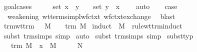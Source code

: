 \begin{isabellebody}
%
\isadelimproof
%
\endisadelimproof
%
\isatagproof
{}\isamarkupfalse%
\ goal{\isacharunderscore}cases\isanewline
{}\isamarkupfalse%
\ {}\isanewline
\ \ \isamarkupfalse%
\ {\isachardoublequoteopen}set\ {\isacharparenleft}{\isacharparenleft}x{\isacharcomma}{\isasymsigma}{\isacharparenright}\ {\isacharhash}\ {\isacharparenleft}y{\isacharcomma}{\isasympi}{\isacharparenright}\ {\isacharhash}\ {\isasymGamma}{\isacharparenright}\ {\isasymsubseteq}\ set\ {\isacharparenleft}{\isacharparenleft}y{\isacharcomma}{\isasympi}{\isacharparenright}\ {\isacharhash}\ {\isacharparenleft}x{\isacharcomma}{\isasymsigma}{\isacharparenright}\ {\isacharhash}\ {\isasymGamma}{\isacharparenright}{\isachardoublequoteclose}\ \isamarkupfalse%
\ auto\isanewline
\ \ \isamarkupfalse%
\ {\isacharquery}case\ \isamarkupfalse%
\ {}\ weakening\ wt{\isacharunderscore}terms{\isacharunderscore}impl{\isacharunderscore}wf{\isacharunderscore}ctxt\ wf{\isacharunderscore}ctxt{\isacharunderscore}exchange\ \isamarkupfalse%
\ blast\isanewline
{}\isamarkupfalse%
%
\endisatagproof
{\isafoldproof}%
%
\isadelimproof
\isanewline
%
\endisadelimproof
\isanewline
{}\isamarkupfalse%
\ trm{\isacharunderscore}wt{\isacharunderscore}trm{\isacharcolon}\ {\isachardoublequoteopen}{\isasymGamma}\ {\isasymturnstile}\ M\ {\isacharcolon}\ {\isasymsigma}\ {\isasymLongrightarrow}\ trm\ M{\isachardoublequoteclose}\isanewline
%
\isadelimproof
%
\endisadelimproof
%
\isatagproof
{}\isamarkupfalse%
\ {\isacharparenleft}induct\ {\isasymGamma}\ M\ {\isasymsigma}\ rule{\isacharcolon}wt{\isacharunderscore}trm{\isachardot}induct{\isacharparenright}\isanewline
{}\isamarkupfalse%
\ {\isacharparenleft}subst\ trm{\isachardot}simps{\isacharcomma}\ simp{\isacharparenright}{\isacharplus}\isanewline
{}\isamarkupfalse%
\ auto{\isacharbrackleft}{}{\isacharbrackright}\isanewline
{}\isamarkupfalse%
\ {\isacharparenleft}subst\ trm{\isachardot}simps{\isacharcomma}\ simp{\isacharparenright}%
\endisatagproof
{\isafoldproof}%
%
\isadelimproof
\isanewline
%
\endisadelimproof
\isanewline
{}\isamarkupfalse%
\ subst{\isacharunderscore}typ{\isacharcolon}\isanewline
\ \ \ {\isachardoublequoteopen}trm\ M{\isachardoublequoteclose}\ \ {\isachardoublequoteopen}{\isacharparenleft}{\isacharparenleft}x{\isacharcomma}{\isasymtau}{\isacharparenright}{\isacharhash}{\isasymGamma}{\isacharparenright}\ {\isasymturnstile}\ M\ {\isacharcolon}\ {\isasymsigma}{\isachardoublequoteclose}\ \ {\isachardoublequoteopen}{\isasymGamma}\ {\isasymturnstile}\ N\ {\isacharcolon}\ {\isasymtau}{\isachardoublequoteclose}\isanewline

\end{isabellebody}
